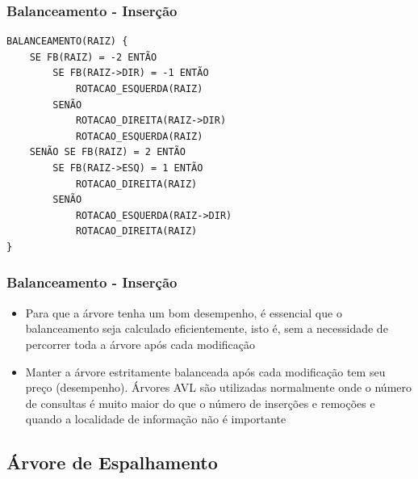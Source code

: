 \begin{frame}[fragile]
\frametitle{Balanceamento - Inserção}
\begin{verbatim}
BALANCEAMENTO(RAIZ) {
    SE FB(RAIZ) = -2 ENTÃO
        SE FB(RAIZ->DIR) = -1 ENTÃO
            ROTACAO_ESQUERDA(RAIZ)
        SENÃO
            ROTACAO_DIREITA(RAIZ->DIR)
            ROTACAO_ESQUERDA(RAIZ)
    SENÃO SE FB(RAIZ) = 2 ENTÃO
        SE FB(RAIZ->ESQ) = 1 ENTÃO
            ROTACAO_DIREITA(RAIZ)
        SENÃO
            ROTACAO_ESQUERDA(RAIZ->DIR)
            ROTACAO_DIREITA(RAIZ)
}
\end{verbatim}
\end{frame}

\begin{frame}[fragile]
\frametitle{Balanceamento - Inserção}

\begin{itemize}
\item Para que a árvore tenha um bom desempenho, é essencial que o balanceamento seja
calculado eficientemente, isto é, sem a necessidade de percorrer toda a árvore após cada
modificação
\item Manter a árvore estritamente balanceada após cada modificação tem seu preço (desempenho).
Árvores AVL são utilizadas normalmente onde o número de consultas é muito maior do que o número de inserções
e remoções e quando a localidade de informação não é importante
\end{itemize}
\end{frame}

\subsection{Árvore de Espalhamento}



